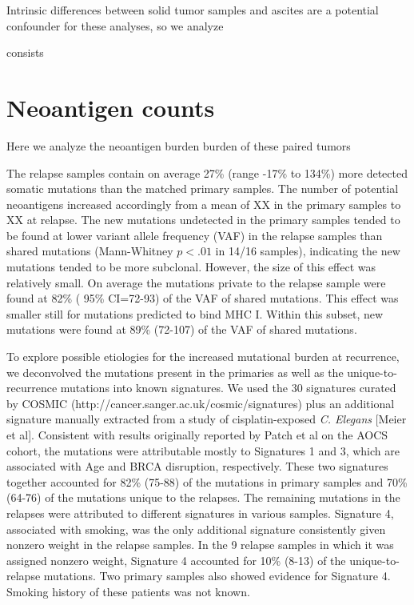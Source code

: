 Intrinsic differences between solid tumor samples and ascites are a potential confounder for these analyses, so we analyze 

consists 

\section*{Neoantigen counts}


Here we analyze the neoantigen burden burden of these paired tumors 

The relapse samples contain on average 27\% (range -17\% to 134\%) more detected somatic mutations than the matched primary samples. The number of potential neoantigens increased accordingly from a mean of XX in the primary samples to XX at relapse. The new mutations undetected in the primary samples tended to be found at lower variant allele frequency (VAF) in the relapse samples than shared mutations (Mann-Whitney $p \lt .01$ in 14/16 samples), indicating the new mutations tended to be more subclonal. However, the size of this effect was relatively small. On average the mutations private to the relapse sample were found at 82\% ( 95\% CI=72-93) of the VAF of shared mutations. This effect was smaller still for mutations predicted to bind MHC I. Within this subset, new mutations were found at 89\% (72-107) of the VAF of shared mutations.

To explore possible etiologies for the increased mutational burden at recurrence, we deconvolved the mutations present in the primaries as well as the unique-to-recurrence mutations into known signatures. We used the 30 signatures curated by COSMIC (http://cancer.sanger.ac.uk/cosmic/signatures) plus an additional signature manually extracted from a study of cisplatin-exposed \textit{C. Elegans} [Meier et al]. Consistent with results originally reported by Patch et al on the AOCS cohort, the mutations were attributable mostly to Signatures 1 and 3, which are associated with Age and BRCA disruption, respectively. These two signatures together accounted for 82\% (75-88) of the mutations in primary samples and 70\% (64-76) of the mutations unique to the relapses. The remaining mutations in the relapses were attributed to different signatures in various samples. Signature 4, associated with smoking, was the only additional signature consistently given nonzero weight in the relapse samples. In the 9 relapse samples in which it was assigned nonzero weight, Signature 4 accounted for 10\% (8-13) of the unique-to-relapse mutations. Two primary samples also showed evidence for Signature 4. Smoking history of these patients was not known.

